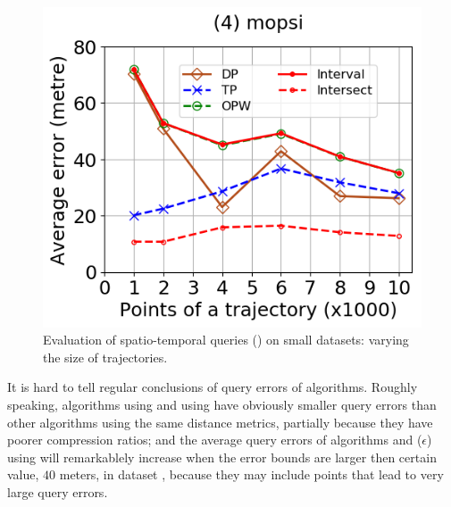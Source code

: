 \begin{figure}[tb!]
	\includegraphics[scale=0.320]{Figures/Exp-query-DAD-error-size-mopsi.png}	
	\vspace{-2ex}
	\caption{\small Evaluation of spatio-temporal queries (\dad) on small datasets: varying the size of trajectories.}
	\label{fig:query-dad-size}
	\vspace{-2ex}
\end{figure}






It is hard to tell regular conclusions of query errors of \lsa algorithms. Roughly speaking, algorithms \intersec using \dad and \squishe using \sed have obviously smaller query errors than other algorithms using the same distance metrics, partially because they have poorer compression ratios; and the average query errors of algorithms \operb and \siped($\epsilon$) using \ped will remarkablely increase when the error bounds are larger then certain value, \eg $40$ meters, in dataset \mopsi, because they may include points that lead to very large query errors. 





